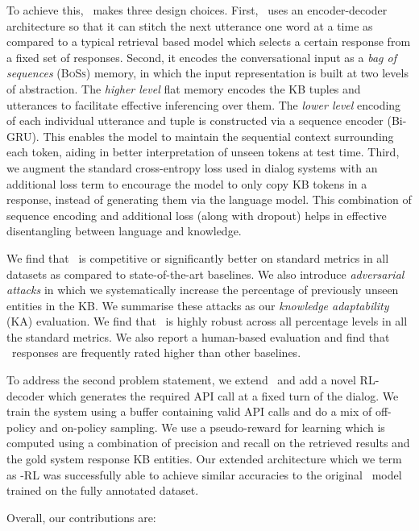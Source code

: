To achieve this, \sys\ makes three design choices. 
First, \sys\ uses an encoder-decoder architecture so that it can stitch the next utterance one word at a time as compared to a typical retrieval based model which selects a certain response from a fixed set of responses. 
Second, it encodes the conversational input as a {\em bag of sequences} (\textsc{BoSs}) memory, in which the input representation is built at two levels of abstraction. The \emph{higher level} flat memory encodes the KB tuples and utterances to facilitate effective inferencing over them. The \emph{lower level} encoding of each individual utterance and tuple is constructed via a sequence encoder (Bi-GRU). This enables the model to maintain the sequential context surrounding each token, aiding in better interpretation of unseen tokens at test time. 
Third, we augment the standard cross-entropy loss used in dialog systems with an additional loss term to encourage the model to only copy KB tokens in a response, instead of generating them via the language model. This combination of sequence encoding and additional loss (along with dropout) helps in effective disentangling between language and knowledge. 

We find that \sys\ is competitive or significantly better on standard metrics in all datasets as compared to state-of-the-art baselines. We also introduce {\em adversarial attacks} in which we systematically increase the percentage of previously unseen entities in the KB. We summarise these attacks as our {\em knowledge adaptability} (KA) evaluation. We find that \sys\ is highly robust across all percentage levels in all the standard metrics. We also report a human-based evaluation and find that \sys\ responses are frequently rated higher than other baselines.

To address the second problem statement, we extend \sys\ and add a novel RL-decoder which generates the required API call at a fixed turn of the dialog. We train the system using a buffer containing valid API calls and do a mix of off-policy and on-policy sampling. We use a pseudo-reward for learning which is computed using a combination of precision and recall on the retrieved results and the gold system response KB entities. Our extended architecture which we term as \sys -RL was successfully able to achieve similar accuracies to the original \sys\ model trained on the fully annotated dataset.

Overall, our contributions are:

